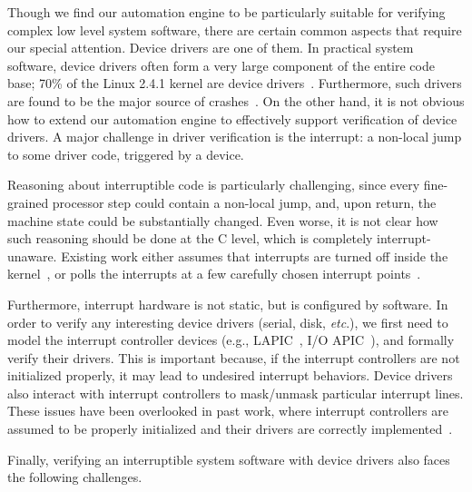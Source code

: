 Though we find our automation engine to be particularly suitable for verifying
complex low level system software, there are certain common aspects that
require our special attention. Device drivers are one of them.
In practical system software, device drivers often form a very large component
of the entire code base; 70\% of the Linux 2.4.1 kernel are
device drivers~\cite{Chou:2001}.
Furthermore, such drivers are found
to be the major source of crashes~\cite{Chou:2001,Ball:2006,Ganapathi:2006}.
On the other hand, it is not obvious how to extend our automation engine
to effectively support verification of device drivers.
A major challenge in driver verification is the interrupt: a non-local
jump to some driver code, triggered by a device. 
Reasoning about interruptible code is
particularly challenging, since every fine-grained processor step
could contain a non-local jump, and, upon return, the machine state
could be substantially changed. Even worse, it is not clear how such
reasoning should be done at the C level, which is completely
interrupt-unaware. Existing work either assumes that interrupts are
turned off inside the kernel~\cite{dscal15,verisoft07}, or polls the
interrupts at a few carefully chosen interrupt points~\cite{klein14}.

Furthermore, interrupt hardware is not static, but is configured by
software. In order to verify any interesting device drivers (serial,
disk, {\it etc}.), we first need to model the interrupt controller
devices (e.g., LAPIC~\cite{mps97}, I/O APIC~\cite{ioapicd96}), and
formally verify their drivers. This is important because, if the
interrupt controllers are not initialized properly, it may lead to
undesired interrupt behaviors. Device drivers also interact with
interrupt controllers to mask/unmask particular interrupt lines.
These issues have been overlooked in past work, where 
interrupt controllers are assumed to be properly initialized and
their drivers are correctly implemented~\cite{Alkassar:VSTTE08-225}.

Finally, verifying an interruptible system software with device
drivers also faces the following challenges.

